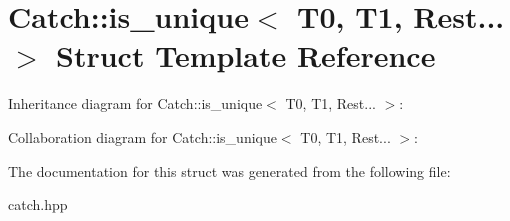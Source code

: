 \hypertarget{structCatch_1_1is__unique_3_01T0_00_01T1_00_01Rest_8_8_8_01_4}{}\section{Catch\+:\+:is\+\_\+unique$<$ T0, T1, Rest... $>$ Struct Template Reference}
\label{structCatch_1_1is__unique_3_01T0_00_01T1_00_01Rest_8_8_8_01_4}


Inheritance diagram for Catch\+:\+:is\+\_\+unique$<$ T0, T1, Rest... $>$\+:


Collaboration diagram for Catch\+:\+:is\+\_\+unique$<$ T0, T1, Rest... $>$\+:


The documentation for this struct was generated from the following file\+:\begin{DoxyCompactItemize}
\item 
catch.\+hpp\end{DoxyCompactItemize}
